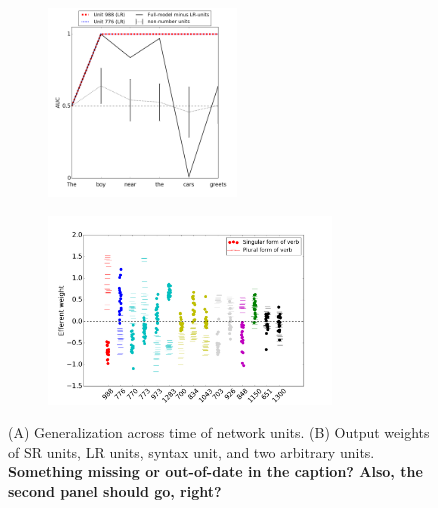 
\begin{figure}[t]
    \centering
    \begin{subfigure}{0.49\textwidth}
            \centering
            \includegraphics[height=5cm]{Figures/GAT1d_cell_nounpp_SR_LR_single_unit.png}
            \label{fig:GAT}
    \end{subfigure}
    \begin{subfigure}{0.49\textwidth}
            \centering
            \includegraphics[height=5cm]{Figures/Figure5_output_weights.png}
            \label{fig:output-weights}
    \end{subfigure}
    
\caption{(A) Generalization across time of network units. (B) Output weights of SR units, LR units, syntax unit, and two arbitrary units. \textbf{Something missing or out-of-date in the caption? Also, the second panel should go, right?}}
\end{figure}

